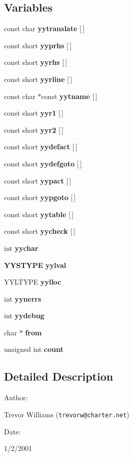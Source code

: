 \subsection*{Variables}
\begin{CompactItemize}
\item 
const char {\bf yytranslate} [$\,$]
\item 
const short {\bf yyprhs} [$\,$]
\item 
const short {\bf yyrhs} [$\,$]
\item 
const short {\bf yyrline} [$\,$]
\item 
const char $\ast$const {\bf yytname} [$\,$]
\item 
const short {\bf yyr1} [$\,$]
\item 
const short {\bf yyr2} [$\,$]
\item 
const short {\bf yydefact} [$\,$]
\item 
const short {\bf yydefgoto} [$\,$]
\item 
const short {\bf yypact} [$\,$]
\item 
const short {\bf yypgoto} [$\,$]
\item 
const short {\bf yytable} [$\,$]
\item 
const short {\bf yycheck} [$\,$]
\item 
int {\bf yychar}
\item 
{\bf YYSTYPE} {\bf yylval}
\item 
YYLTYPE {\bf yylloc}
\item 
int {\bf yynerrs}
\item 
int {\bf yydebug}
\item 
char $\ast$ {\bf from}
\item 
unsigned int {\bf count}
\end{CompactItemize}


\subsection{Detailed Description}


\begin{Desc}
\item[Author: ]\par
Trevor Williams ({\tt trevorw@charter.net}) \end{Desc}
\begin{Desc}
\item[Date: ]\par
1/2/2001\end{Desc}


